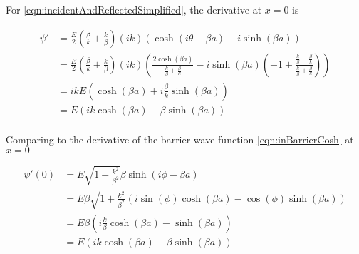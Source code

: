 \documentclass{article}
\begin{document}
For \ref{eqn:incidentAndReflectedSimplified}, the derivative at $x=0$ is

\begin{align*}
\psi' 
&=
\frac{E}{2} \left(\frac{\beta}{k} + \frac{k}{\beta} \right) (ik)
\left(
\cosh\left( i\theta -\beta a \right) 
+i \sinh\left( \beta a \right) 
\right) \\
&=
\frac{E}{2} \left(\frac{\beta}{k} + \frac{k}{\beta} \right) (ik)
\left(
\frac{ 2 \cosh(\beta a ) }{\frac{k}{\beta} + \frac{\beta}{k} }
-i \sinh( \beta a ) \left( -1 + \frac{\frac{k}{\beta} - \frac{\beta}{k}}{ \frac{k}{\beta} + \frac{\beta}{k}} \right) 
\right) \\
&=
i k E \left( \cosh(\beta a ) + i \frac{\beta}{k}\sinh(\beta a) \right) \\
&=
E \left( i k \cosh(\beta a ) - \beta \sinh(\beta a) \right) \\
\end{align*}

Comparing to the derivative of the barrier wave function \ref{eqn:inBarrierCosh} at $x=0$

\begin{align*}
\psi'(0)
&= E \sqrt{1 + \frac{k^2}{\beta^2}} \beta \sinh\left( i\phi - \beta a \right)  \\
&= E \beta \sqrt{1 + \frac{k^2}{\beta^2}} 
\left(
i\sin(\phi)\cosh(\beta a)
-\cos(\phi)\sinh(\beta a)
\right) \\
&= E \beta 
\left(
i\frac{k}{\beta}\cosh(\beta a)
-\sinh(\beta a)
\right) \\
&= E 
\left(
ik \cosh(\beta a)
- \beta \sinh(\beta a)
\right) \\
\end{align*}



\end{document}
